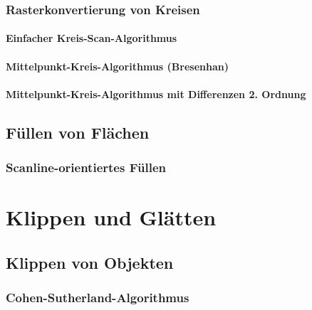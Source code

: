 \documentclass{scrreprt}
\begin{document}
\subsection{Rasterkonvertierung von Kreisen}
\subsubsection{Einfacher Kreis-Scan-Algorithmus}
\subsubsection{Mittelpunkt-Kreis-Algorithmus (Bresenhan)}
\subsubsection{Mittelpunkt-Kreis-Algorithmus mit Differenzen 2. Ordnung}
\section{Füllen von Flächen}
\subsection{Scanline-orientiertes Füllen}

\chapter{Klippen und Glätten}
\section{Klippen von Objekten}
\subsection{Cohen-Sutherland-Algorithmus}
\end{document}
